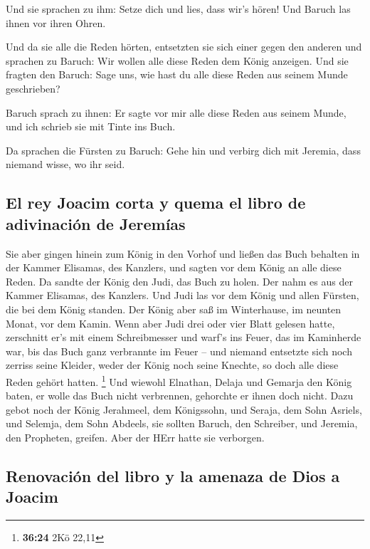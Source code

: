  Und sie sprachen zu ihm: Setze dich und lies, dass wir's
hören! Und Baruch las ihnen vor ihren Ohren.

 Und da sie alle die Reden hörten, entsetzten sie sich
einer gegen den anderen und sprachen zu Baruch: Wir wollen alle diese
Reden dem König anzeigen.  Und sie fragten den Baruch:
Sage uns, wie hast du alle diese Reden aus seinem Munde geschrieben?

 Baruch sprach zu ihnen: Er sagte vor mir alle diese
Reden aus seinem Munde, und ich schrieb sie mit Tinte ins Buch.

 Da sprachen die Fürsten zu Baruch: Gehe hin und verbirg
dich mit Jeremia, dass niemand wisse, wo ihr seid.

\hypertarget{el-rey-joacim-corta-y-quema-el-libro-de-adivinaciuxf3n-de-jeremuxedas}{%
\subsection{El rey Joacim corta y quema el libro de adivinación de
Jeremías}\label{el-rey-joacim-corta-y-quema-el-libro-de-adivinaciuxf3n-de-jeremuxedas}}

 Sie aber gingen hinein zum König in den Vorhof und
ließen das Buch behalten in der Kammer Elisamas, des Kanzlers, und
sagten vor dem König an alle diese Reden.  Da sandte der
König den Judi, das Buch zu holen. Der nahm es aus der Kammer Elisamas,
des Kanzlers. Und Judi las vor dem König und allen Fürsten, die bei dem
König standen.  Der König aber saß im Winterhause, im
neunten Monat, vor dem Kamin.  Wenn aber Judi drei oder
vier Blatt gelesen hatte, zerschnitt er's mit einem Schreibmesser und
warf's ins Feuer, das im Kaminherde war, bis das Buch ganz verbrannte im
Feuer --  und niemand entsetzte sich noch zerriss seine
Kleider, weder der König noch seine Knechte, so doch alle diese Reden
gehört hatten. \footnote{\textbf{36:24} 2Kö 22,11}  Und
wiewohl Elnathan, Delaja und Gemarja den König baten, er wolle das Buch
nicht verbrennen, gehorchte er ihnen doch nicht.  Dazu
gebot noch der König Jerahmeel, dem Königssohn, und Seraja, dem Sohn
Asriels, und Selemja, dem Sohn Abdeels, sie sollten Baruch, den
Schreiber, und Jeremia, den Propheten, greifen. Aber der HErr hatte sie
verborgen.

\hypertarget{renovaciuxf3n-del-libro-y-la-amenaza-de-dios-a-joacim}{%
\subsection{Renovación del libro y la amenaza de Dios a
Joacim}\label{renovaciuxf3n-del-libro-y-la-amenaza-de-dios-a-joacim}}

